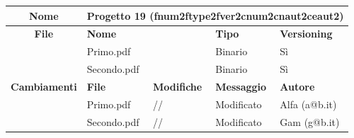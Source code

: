 \begin{table}[ht]
\footnotesize
\begin{tabular}{|c|p{2.5cm}|p{2cm}|p{2.5cm}|p{2.5cm}|}
  \hline
  \textbf{Nome}	& \multicolumn{4}{l|}{Progetto 19 (fnum2ftype2fver2cnum2cnaut2ceaut2)} 									\\
  \hline
  \rowcolor{lightgray}\textbf{File} 		& \multicolumn{2}{l|}{\textbf{Nome}}		& \textbf{Tipo}		& \textbf{Versioning} 		\\
						\cline{2-5}
						& \multicolumn{2}{l|}{Primo.pdf}		& Binario		& Sì				\\
						\cline{2-5}
						& \multicolumn{2}{l|}{Secondo.pdf}		& Binario		& Sì				\\
  \hline
  \rowcolor{lightgray}\textbf{Cambiamenti}	& \textbf{File}		&\textbf{Modifiche}	& \textbf{Messaggio}	& \textbf{Autore}		\\
						\cline{2-5}
						& Primo.pdf		& //	  		& Modificato		& Alfa (a@b.it)			\\
						\cline{2-5}
						& Secondo.pdf		& //	  		& Modificato		& Gam (g@b.it)		\\
						
  \hline
\end{tabular}
\end{table}